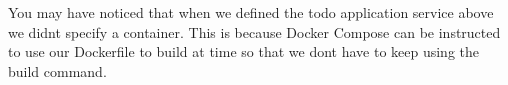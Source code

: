 \documentclass{csse4400}
\begin{document}
You may have noticed that when we defined the todo application service above we didnt specify a container. This is because Docker Compose can be instructed to use our Dockerfile to build at time so that we dont have to keep using the build command.










\end{document}

